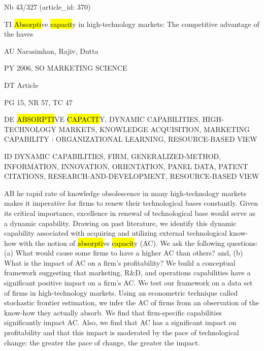 \documentclass[a4paper]{article}
\begin{document}
\vspace*{-2cm}
Nb \tabto{0cm}43/327 (article\_id: 370)\par
TI \tabto{0cm}\hl{Absorpti}ve \hl{capacit}y in high-technology markets: The competitive advantage of the haves\par
AU \tabto{0cm}Narasimhan, Rajiv, Dutta\par
PY \tabto{0cm}2006, SO MARKETING SCIENCE\par
DT \tabto{0cm}Article\par
PG \tabto{0cm}15, NR 57, TC 47\par
DE \tabto{0cm}\hl{ABSORPTI}VE \hl{CAPACIT}Y, DYNAMIC CAPABILITIES, HIGH-TECHNOLOGY MARKETS, KNOWLEDGE ACQUISITION, MARKETING CAPABILITY : ORGANIZATIONAL LEARNING, RESOURCE-BASED VIEW\par
ID \tabto{0cm}DYNAMIC CAPABILITIES, FIRM, GENERALIZED-METHOD, INFORMATION, INNOVATION, ORIENTATION, PANEL DATA, PATENT CITATIONS, RESEARCH-AND-DEVELOPMENT, RESOURCE-BASED VIEW\par
AB \tabto{0cm}he rapid rate of knowledge obsolescence in many high-technology markets makes it imperative for firms to renew their technological bases constantly. Given its critical importance, excellence in renewal of technological base would serve as a dynamic capability. Drawing on past literature, we identify this dynamic capability associated with acquiring and utilizing external technological know-how with the notion of \hl{absorpti}ve \hl{capacit}y (AC).
We ask the following questions: (a) What would cause some firms to have a higher AC than others? and, (b) What is the impact of AC on a firm's profitability?
We build a conceptual framework suggesting that marketing, R\&D, and operations capabilities have a significant positive impact on a firm's AC. We test our framework on a data set of firms in high-technology markets. Using an econometric technique called stochastic frontier estimation, we infer the AC of firms from an observation of the know-how they actually absorb. We find that firm-specific capabilities significantly impact AC. Also, we find that AC has a significant impact on profitability and that this impact is moderated by the pace of technological change: the greater the pace of change, the greater the impact.\par
\clearpage
\end{document}
